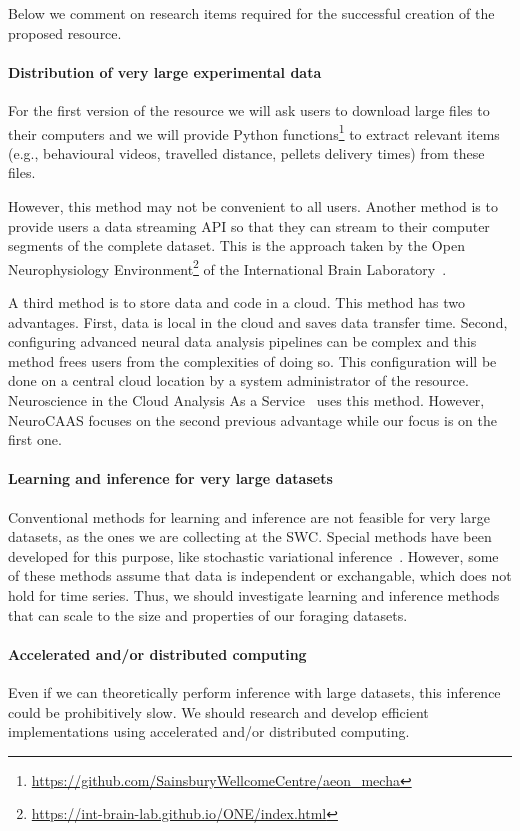 Below we comment on research items required for the successful creation of the
proposed resource.

\paragraph{Distribution of very large experimental data}

For the first version of the resource we will ask users to download large files
to their computers and we will provide Python
functions\footnote{\url{https://github.com/SainsburyWellcomeCentre/aeon\_mecha}}
to extract relevant items (e.g., behavioural videos, travelled distance, pellets
delivery times) from these files.

However, this method may not be convenient to all users. Another method is to
provide users a data streaming API so that they can stream to their computer
segments of the complete dataset. This is the approach taken by the Open
Neurophysiology
Environment\footnote{\url{https://int-brain-lab.github.io/ONE/index.html}} of
the International Brain Laboratory~\citep{bonacchiEtAl23}.

A third method is to store data and code in a cloud. This method
has two advantages. First, data is local in the cloud and saves data transfer
time. Second, configuring advanced neural data analysis pipelines can be
complex and this method frees users from the complexities of doing so. This
configuration will be done on a central cloud location by a system
administrator of the resource. Neuroscience in the Cloud Analysis As a
Service~\citep[NeuroCAAS][]{abeEtAl22} uses this method. However, NeuroCAAS
focuses on the second previous advantage while our focus is on the first one.

\paragraph{Learning and inference for very large datasets}

Conventional methods for learning and inference are not feasible for very large
datasets, as the ones we are collecting at the SWC. Special methods have been
developed for this purpose, like stochastic variational
inference~\citep{hoffmanEtAl13}. However, some of these methods assume that
data is independent or exchangable, which does not hold for time series. Thus,
we should investigate learning and inference methods that can scale to the size
and properties of our foraging datasets.

\paragraph{Accelerated and/or distributed computing}

Even if we can theoretically perform inference with large datasets, this
inference could be prohibitively slow. We should research and develop efficient
implementations using accelerated and/or distributed computing.



